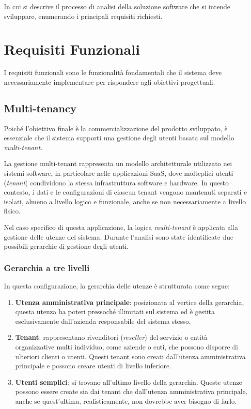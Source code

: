 In cui si descrive il processo di analisi della soluzione software che si intende sviluppare, enumerando i principali requisiti richiesti.

\section{Requisiti Funzionali}
I requisiti funzionali sono le funzionalità fondamentali che il sistema deve necessariamente implementare per rispondere agli obiettivi progettuali.

\subsection{Multi-tenancy}
Poiché l'obiettivo finale è la commercializzazione del prodotto sviluppato, è essenziale che il sistema supporti una gestione degli utenti basata sul modello \emph{multi-tenant}.

La gestione multi-tenant rappresenta un modello architetturale utilizzato nei sistemi software, in particolare nelle applicazioni SaaS, dove molteplici utenti (\emph{tenant}) condividono la stessa infrastruttura software e hardware. In questo contesto, i dati e le configurazioni di ciascun tenant vengono mantenuti separati e isolati, almeno a livello logico e funzionale, anche se non necessariamente a livello fisico.

Nel caso specifico di questa applicazione, la logica \emph{multi-tenant} è applicata alla gestione delle utenze del sistema. Durante l'analisi sono state identificate due possibili gerarchie di gestione degli utenti.

\subsubsection{Gerarchia a tre livelli}
\label{3-level}
In questa configurazione, la gerarchia delle utenze è strutturata come segue:

\begin{enumerate}
    \item \textbf{Utenza amministrativa principale}: posizionata al vertice della gerarchia, questa utenza ha poteri pressoché illimitati sul sistema ed è gestita esclusivamente dall'azienda responsabile del sistema stesso.
    \item \textbf{Tenant}: rappresentano rivenditori (\emph{reseller}) del servizio o entità organizzative multi individuo, come aziende o enti, che possono disporre di ulteriori clienti o utenti. Questi tenant sono creati dall'utenza amministrativa principale e possono creare utenti di livello inferiore.
    \item \textbf{Utenti semplici}: si trovano all'ultimo livello della gerarchia. Queste utenze possono essere create sia dai tenant che dall'utenza amministrativa principale, anche se quest'ultima, realisticamente, non dovrebbe aver bisogno di farlo.
\end{enumerate}


